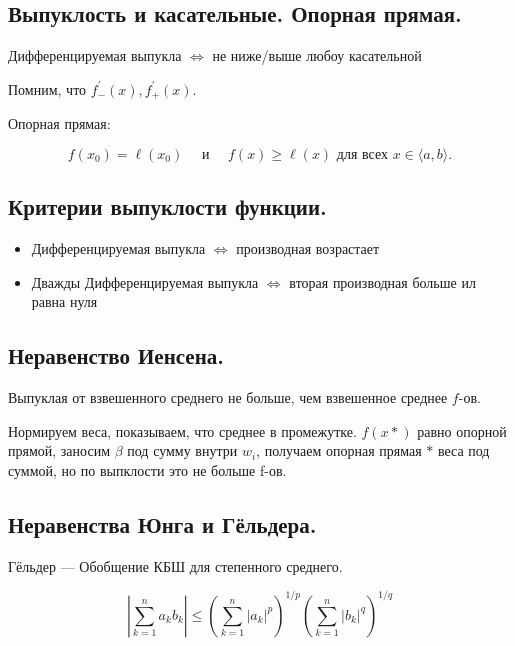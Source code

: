\documentclass[12pt, a4paper]{article}
\begin{document}
\subsection{Выпуклость и касательные. Опорная прямая.}

Дифференцируемая выпукла $\Longleftrightarrow$ не ниже/выше любоу касательной

Помним, что $f_{-}^{\prime}(x), f_{+}^{\prime}(x)$.


Опорная прямая: 

\begin{equation*}
    f\left(x_{0}\right)=\ell\left(x_{0}\right) \quad \text { и } \quad f(x) \geqslant \ell(x) \text { для всех } x \in\langle a, b\rangle .
\end{equation*}


\subsection{Критерии выпуклости функции.}

\begin{itemize}
    \item Дифференцируемая выпукла $\Leftrightarrow$ производная возрастает
    \item Дважды Дифференцируемая выпукла $\Leftrightarrow$ вторая производная больше ил равна нуля
\end{itemize}



\subsection{Неравенство Иенсена.}

Выпуклая от взвешенного среднего не больше, чем взвешенное среднее $f$-ов.

Нормируем веса, показываем, что среднее в промежутке. 
$f(x*)$ равно опорной прямой, заносим $\beta$ под сумму внутри $w_i$, 
получаем опорная прямая $*$ веса под суммой, но по выпклости это не больше f-ов.


\subsection{Неравенства Юнга и Гёльдера.}

Гёльдер — Обобщение КБШ для степенного среднего.

\begin{equation*}
    \left|\sum_{k=1}^{n} a_{k} b_{k}\right| \leqslant\left(\sum_{k=1}^{n}\left|a_{k}\right|^{p}\right)^{1 / p}\left(\sum_{k=1}^{n}\left|b_{k}\right|^{q}\right)^{1 / q}
\end{equation*}
\end{document}

